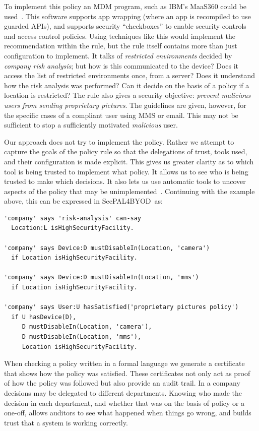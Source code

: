 \documentclass{llncs}
\newcommand{\AppPAL}[0]{SecPAL4BYOD}
\begin{document}
To implement this policy an \ac{MDM} program, such as IBM's MaaS360 could be used~\cite{_ibm_????}.
This software supports app wrapping (where an app is recompiled to use guarded APIs), and supports security ``checkboxes'' to enable security controls and access control policies.
Using techniques like this would implement the recommendation within the rule, but the rule itself contains more than just configuration to implement.
It talks of \emph{restricted environments} decided by \emph{company risk analysis}; but how is this communicated to the device?
Does it access the list of restricted environments once, from a server?
Does it understand how the risk analysis was performed?
Can it decide on the basis of a policy if a location is restricted?
The rule also gives a security objective: \emph{prevent malicious users from sending proprietary pictures}.
The guidelines are given, however, for the specific cases of a compliant user using MMS or email.
This may not be sufficient to stop a sufficiently motivated \emph{malicious} user.

Our approach does not try to implement the policy.
Rather we attempt to capture the goals of the policy rule so that the delegations of trust, tools used, and their configuration is made explicit.
This gives us greater clarity as to which tool is being trusted to implement what policy.
It allows us to see who is being trusted to make which decisions.
It also lets us use automatic tools to uncover aspects of the policy that may be unimplemented~\cite{hallett_specifying_2016}.
Continuing with the example above, this can be expressed in \AppPAL~as:

\begin{lstlisting}
'company' says 'risk-analysis' can-say
  Location:L isHighSecurityFacility.

'company' says Device:D mustDisableIn(Location, 'camera')
  if Location isHighSecurityFacility.

'company' says Device:D mustDisableIn(Location, 'mms')
  if Location isHighSecurityFacility.

'company' says User:U hasSatisfied('proprietary pictures policy')
  if U hasDevice(D),
     D mustDisableIn(Location, 'camera'),
     D mustDisableIn(Location, 'mms'),
     Location isHighSecurityFacility.
\end{lstlisting}

When checking a policy written in a formal language we generate a certificate that shows how the policy was satisfied.
These certificates not only act as proof of how the policy was followed but also provide an audit trail.
In a company decisions may be delegated to different departments.
Knowing who made the decision in each department, and whether that was on the basis of policy or a one-off, allows auditors to see what happened when things go wrong, and builds trust that a system is working correctly.
\end{document}
